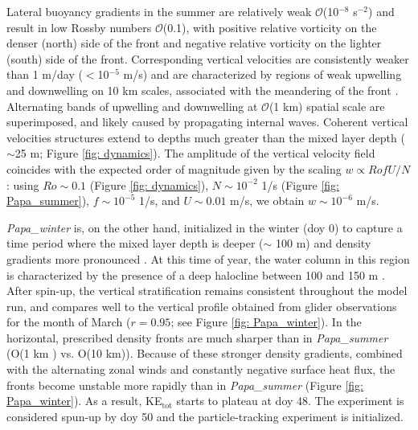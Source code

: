 \documentclass[draft,linenumbers]{agujournal2018}
\begin{document}
Lateral buoyancy gradients in the summer are relatively weak $\mathcal{O}$(10$^{-8}$ s$^{-2}$) and result in low Rossby numbers $\mathcal{O}$(0.1), with positive relative vorticity on the denser (north) side of the front and negative relative vorticity on the lighter (south) side of the front. Corresponding vertical velocities are consistently weaker than 1 m/day ($<$10$^{-5}$ m/s) and are characterized by regions of weak upwelling and downwelling on 10 km scales, associated with the meandering of the front \citep{Bower_1989}. Alternating bands of upwelling and downwelling at $\mathcal{O}$(1 km) spatial scale are superimposed, and likely caused by propagating internal waves. Coherent vertical velocities structures extend to depths much greater than the mixed layer depth ($\sim$25 m; Figure \ref{fig: dynamics}). The amplitude of the vertical velocity field coincides with the expected order of magnitude given by the scaling $w \propto RofU/N$ \citep{Mahadevan_2016}: using $Ro\sim0.1$ (Figure \ref{fig: dynamics}), $N\sim10^{-2}$ 1/s (Figure \ref{fig: Papa_summer}), $f\sim10^{-5}$ 1/s, and $U\sim0.01$ m/s, we obtain $w\sim 10^{-6}$ m/s. %

\textit{Papa\_winter} is, on the other hand, initialized in the winter (doy 0) to capture a time period where the mixed layer depth is deeper ($\sim$ 100 m) and density gradients more pronounced \citep{Pelland_2016}. At this time of year, the water column in this region is characterized by the presence of a deep halocline between 100 and 150 m \citep[Figure \ref{fig: Papa_winter}][]{Pelland_2016}. After spin-up, the vertical stratification remains consistent throughout the model run, and compares well to the vertical profile obtained from glider observations for the month of March ($r = 0.95$; see Figure \ref{fig: Papa_winter}). In the horizontal, prescribed density fronts are much sharper than in \textit{Papa\_summer} (O(1 km ) vs. O(10 km)). Because of these stronger density gradients, combined with the alternating zonal winds and constantly negative surface heat flux, the fronts become unstable more rapidly than in \textit{Papa\_summer} (Figure \ref{fig: Papa_winter}). As a result, KE$_{\text{tot}}$ starts to plateau at doy 48. The experiment is considered spun-up by doy 50 and the particle-tracking experiment is initialized. %
\end{document}
